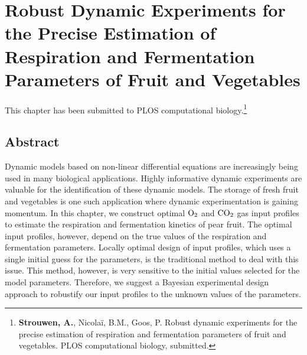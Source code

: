 \chapter{Robust Dynamic Experiments for the Precise Estimation of Respiration and Fermentation Parameters of Fruit and Vegetables}
\label{paper2}
This chapter has been submitted to PLOS computational biology.\footnote{\textbf{Strouwen, A.}, Nicolaï, B.M., Goos, P. Robust dynamic experiments for the precise estimation of respiration and fermentation parameters of fruit and vegetables. PLOS computational biology, submitted. }
\section*{Abstract}
Dynamic models based on non-linear differential equations are increasingly being used in many biological applications. Highly informative dynamic experiments are valuable for the identification of these dynamic models. The storage of fresh fruit and vegetables is one such application where dynamic experimentation is gaining momentum. In this chapter, we construct optimal $\text{O}_2$ and $\text{CO}_2$ gas input profiles to estimate the respiration and fermentation kinetics of pear fruit. The optimal input profiles, however, depend on the true values of the respiration and fermentation parameters. Locally optimal design of input profiles, which uses a single initial guess for the parameters, is the traditional method to deal with this issue. This method, however, is very sensitive to the initial values selected for the model parameters. Therefore, we suggest a Bayesian experimental design approach to robustify our input profiles to the unknown values of the parameters.
